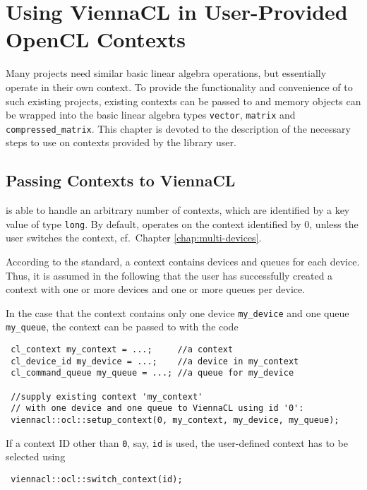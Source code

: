 \chapter{Using ViennaCL in User-Provided OpenCL Contexts} \label{chap:custom-contexts}

Many projects need similar basic linear algebra operations, but essentially operate in their own {\OpenCL} context.
To provide the functionality and convenience of {\ViennaCL} to such existing projects,
existing contexts can be passed to {\ViennaCL} and memory objects can be wrapped into the basic linear algebra types \lstinline|vector|, \lstinline|matrix| and \lstinline|compressed_matrix|.
This chapter is devoted to the description of the necessary steps to use {\ViennaCL} on contexts provided by the library user.


\section{Passing Contexts to ViennaCL}
{\ViennaCLversion} is able to handle an arbitrary number of contexts, which are identified by a key value of type \lstinline|long|.
By default, {\ViennaCL} operates on the context identified by $0$, unless the user switches the context, cf.~Chapter \ref{chap:multi-devices}.

According to the {\OpenCL} standard, a context contains devices and queues for each device. Thus, it is assumed in the following that
the user has successfully created a context with one or more devices and one or more queues per device.

In the case that the context contains only one device \lstinline|my_device| and one queue \lstinline|my_queue|, the context can be passed to {\ViennaCL} with the code
\begin{lstlisting}
 cl_context my_context = ...;     //a context
 cl_device_id my_device = ...;    //a device in my_context
 cl_command_queue my_queue = ...; //a queue for my_device

 //supply existing context 'my_context'
 // with one device and one queue to ViennaCL using id '0':
 viennacl::ocl::setup_context(0, my_context, my_device, my_queue);
\end{lstlisting}
If a context ID other than \texttt{0}, say, \lstinline|id| is used, the user-defined context has to be selected using
\begin{lstlisting}
 viennacl::ocl::switch_context(id);
\end{lstlisting}

